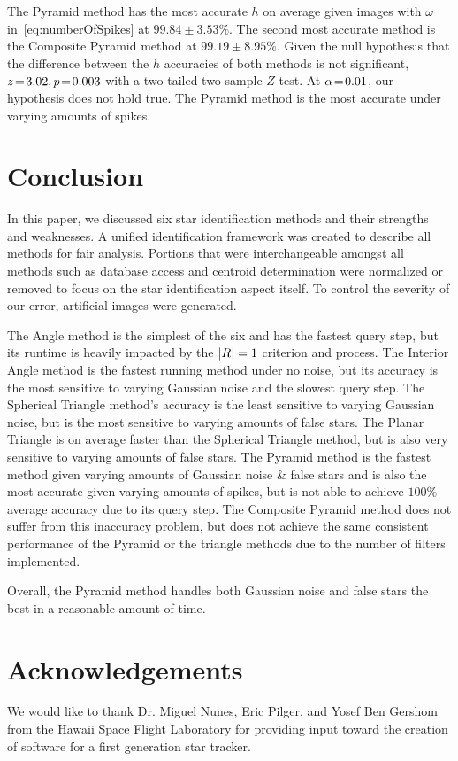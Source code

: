 \documentclass[conference]{IEEEtran}
\begin{document}
    The Pyramid method has the most accurate $h$ on average given images with $\omega$ in~\autoref{eq:numberOfSpikes}
    at $99.84\!\pm\!3.53\%$.
    The second most accurate method is the Composite Pyramid method at $99.19\!\pm\!8.95\%$.
    Given the null hypothesis that the difference between the $h$ accuracies of both methods is not significant,
    $z \!=\! 3.02, p \!=\! 0.003$ with a two-tailed two sample $Z$ test.
    At $\alpha \!=\! 0.01$, our hypothesis does not hold true.
    The Pyramid method is the most accurate under varying amounts of spikes.

    \section{Conclusion}\label{sec:conclusion}
    In this paper, we discussed six star identification methods and their strengths and weaknesses.
    A unified identification framework was created to describe all methods for fair analysis.
    Portions that were interchangeable amongst all methods such as database access and centroid determination were
    normalized or removed to focus on the star identification aspect itself.
    To control the severity of our error, artificial images were generated.

    The Angle method is the simplest of the six and has the fastest query step, but its runtime is heavily impacted by
    the $\left| R \right| = 1$ criterion and  process.
    The Interior Angle method is the fastest running method under no noise, but its accuracy is the most sensitive to
    varying Gaussian noise and the slowest query step.
    The Spherical Triangle method's accuracy is the least sensitive to varying Gaussian noise, but is the most sensitive
    to varying amounts of false stars.
    The Planar Triangle is on average faster than the Spherical Triangle method, but is also very sensitive to varying
    amounts of false stars.
    The Pyramid method is the fastest method given varying amounts of Gaussian noise \& false stars and is also the most
    accurate given varying amounts of spikes, but is not able to achieve $100\%$ average accuracy due to its query step.
    The Composite Pyramid method does not suffer from this inaccuracy problem, but does not achieve the same consistent
    performance of the Pyramid or the triangle methods due to the number of filters implemented.

    Overall, the Pyramid method handles both Gaussian noise and false stars the best in a reasonable amount of time.

    \section{Acknowledgements}\label{sec:acknowledgements}
    We would like to thank Dr. Miguel Nunes, Eric Pilger, and Yosef Ben Gershom from the Hawaii Space Flight Laboratory
    for providing input toward the creation of software for a first generation star tracker.

    \balance

    
%    
    
\end{document}
